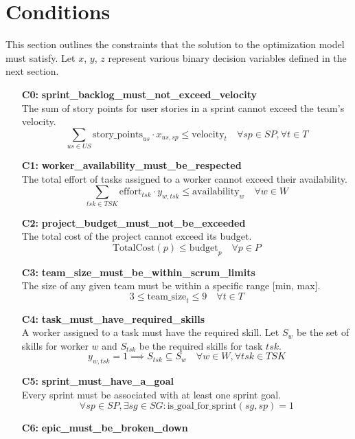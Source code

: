\documentclass[11pt, a4paper]{article}
\begin{document}
\section{Conditions}
This section outlines the constraints that the solution to the optimization model must satisfy. Let $x$, $y$, $z$ represent various binary decision variables defined in the next section.

\begin{itemize}
    \item[\textbf{C0:}] \textbf{sprint\_backlog\_must\_not\_exceed\_velocity} \\
    The sum of story points for user stories in a sprint cannot exceed the team's velocity.
    $$ \sum_{us \in US} \text{story\_points}_{us} \cdot x_{us, sp} \leq \text{velocity}_{t} \quad \forall sp \in SP, \forall t \in T $$
    \item[\textbf{C1:}] \textbf{worker\_availability\_must\_be\_respected} \\
    The total effort of tasks assigned to a worker cannot exceed their availability.
    $$ \sum_{tsk \in TSK} \text{effort}_{tsk} \cdot y_{w, tsk} \leq \text{availability}_{w} \quad \forall w \in W $$
    \item[\textbf{C2:}] \textbf{project\_budget\_must\_not\_be\_exceeded} \\
    The total cost of the project cannot exceed its budget.
    $$ \text{TotalCost}(p) \leq \text{budget}_{p} \quad \forall p \in P $$
    \item[\textbf{C3:}] \textbf{team\_size\_must\_be\_within\_scrum\_limits} \\
    The size of any given team must be within a specific range [min, max].
    $$ 3 \leq \text{team\_size}_{t} \leq 9 \quad \forall t \in T $$
    \item[\textbf{C4:}] \textbf{task\_must\_have\_required\_skills} \\
    A worker assigned to a task must have the required skill. Let $S_w$ be the set of skills for worker $w$ and $S_{tsk}$ be the required skills for task $tsk$.
    $$ y_{w, tsk} = 1 \implies S_{tsk} \subseteq S_w \quad \forall w \in W, \forall tsk \in TSK $$
    \item[\textbf{C5:}] \textbf{sprint\_must\_have\_a\_goal} \\
    Every sprint must be associated with at least one sprint goal.
    $$ \forall sp \in SP, \exists sg \in SG : \text{is\_goal\_for\_sprint}(sg, sp) = 1 $$
    \item[\textbf{C6:}] \textbf{epic\_must\_be\_broken\_down} \\

\end{itemize}
\end{document}
